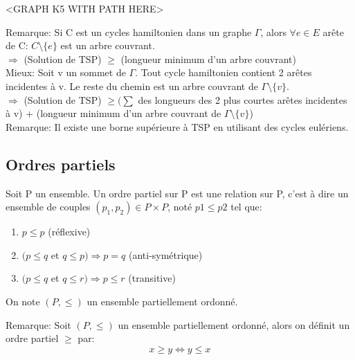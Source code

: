 \begin{exmp}
<GRAPH K5 WITH PATH HERE>\\
\end{exmp}

Remarque: Si C est un cycles hamiltonien dans un graphe $\Gamma$, alors $\forall e \in E$ arête de C: $ C \setminus\{e\}$ est un arbre couvrant.\\

$\Rightarrow$ (Solution de TSP) $\geq$ (longueur minimum d'un arbre couvrant)\\

Mieux: Soit v un sommet de $\Gamma$. Tout cycle hamiltonien contient 2 arêtes incidentes à v. Le reste du chemin est un arbre couvrant de $\Gamma \setminus\{v\}$.\\

$\Rightarrow$ (Solution de TSP) $\geq (\sum$ des longueurs des 2 plus courtes arêtes incidentes à v) + (longueur minimum d'un arbre couvrant de $\Gamma \setminus\{v\}$)\\

Remarque: Il existe une borne supérieure à TSP en utilisant des cycles eulériens. \\


\subsection{Ordres partiels}

\begin{defn}
Soit P un ensemble. Un ordre partiel sur P est une relation sur P, c'est à dire un ensemble de couples $(p_{1},p_{2}) \in P\times P$, noté $p{1} \leq p{2}$ tel que:
	\begin{enumerate}
		\item $p \leq p$ (réflexive)
		\item $(p \leq q$ et $q \leq p ) \Rightarrow p = q$ (anti-symétrique)
		\item $(p \leq q$ et $q \leq r ) \Rightarrow p \leq r$ (transitive)\\
	\end{enumerate}
On note $(P,\leq)$ un ensemble partiellement ordonné.\\
\end{defn}

Remarque: Soit $(P,\leq)$ un ensemble partiellement ordonné, alors on définit un ordre partiel $\geq$ par: $$x \geq y \Leftrightarrow y \leq x$$

